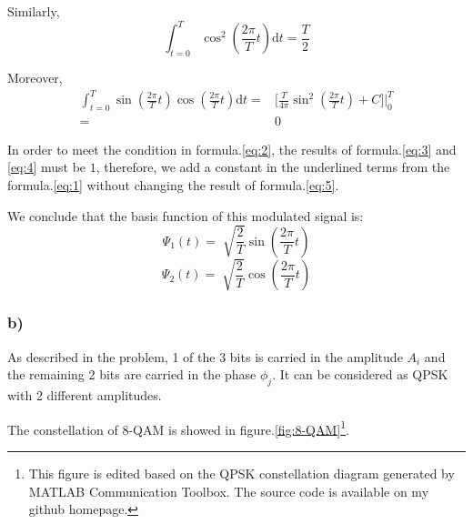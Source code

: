 \documentclass{article}
\begin{document}
\par Similarly, 
\begin{equation}\label{eq:4}
\int_{t=0}^{T}\cos^{2}(\frac{2\pi}{T}t) \mathrm{d}t = \frac{T}{2}
\end{equation}

\par Moreover,
\begin{equation}\label{eq:5}
\begin{split}
\int_{t=0}^{T}\sin(\frac{2\pi}{T}t)\cos(\frac{2\pi}{T}t)\mathrm{d}t = & \bigg[\frac{T}{4\pi}\sin^{2}(\frac{2\pi}{T}t) + C\bigg] \bigg|_{0}^{T} \\
= & 0  
\end{split}
\end{equation}


\par In order to meet the condition in formula.\ref{eq:2}, the results of formula.\ref{eq:3} and \ref{eq:4} must be $1$, therefore, we add a constant in the underlined terms from the formula.\ref{eq:1} without changing the result of formula.\ref{eq:5}.

\par We conclude that the basis function of this modulated signal is:
$$ \Psi_1(t) = \sqrt[]{\frac{2}{T}}\sin(\frac{2\pi}{T}t) $$
$$ \Psi_2(t) =\sqrt[]{\frac{2}{T}}\cos(\frac{2\pi}{T}t) $$


\subsubsection*{b)}
\par As described in the problem, 1 of the 3 bits is carried in the amplitude $A_i$ and the remaining 2 bits are carried in the phase $\phi_j$. It can be considered as QPSK with 2 different amplitudes.

\par The constellation of 8-QAM is showed in figure.\ref{fig:8-QAM}\footnote{This figure is edited based on the QPSK constellation diagram generated by MATLAB Communication Toolbox. The source code is available on my github homepage.}.
\end{document}
